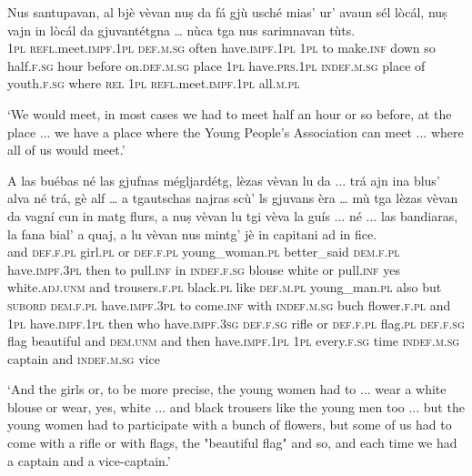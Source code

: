 \begin{linenumbers}
	\gll Nus santupavan, al bjè vèvan nuṣ da fá gjù usché mias’ ur’ avaun sél lòcál, nuṣ vajn in lòcál da gjuvantétgna … nùca tga nus sarimnavan tùts.   \\
	\textsc{1pl} \textsc{refl}.meet.\textsc{impf.1pl} \textsc{def.m.sg} often have.\textsc{impf.1pl} \textsc{1pl} to make.\textsc{inf} down so half.\textsc{f.sg} hour before on.\textsc{def.m.sg} place \textsc{1pl} have.\textsc{prs.1pl} \textsc{indef.m.sg} place of youth.\textsc{f.sg} {} where \textsc{rel} \textsc{1pl} \textsc{refl}.meet.\textsc{impf.1pl} all.\textsc{m.pl} \\
\end{linenumbers}
\medskip
\glt `We would meet, in most cases we had to meet half an hour or so before, at the place ... we have a place where the Young People's Association can meet ... where all of us would meet.'
\medskip

\begin{linenumbers}
	\gll A las buébas né las gjufnas mégljardétg, lèzas vèvan lu da ... trá ajn ina blus’ alva né trá, gè alf … a tgautschas najras scù’ ls gjuvans èra … mù tga lèzas vèvan da vagní cun in matg flurs, a nuṣ vèvan lu tgi vèva la guís ... né ... las bandiaras, la fana bial’ a quaj, a lu vèvan nus mintg’ jè in capitani ad in fice.   \\
and \textsc{def.f.pl} girl.\textsc{pl} or \textsc{def.f.pl} young\_woman.\textsc{pl} better\_said \textsc{dem.f.pl} have.\textsc{impf.3pl} then to {} pull.\textsc{inf} in \textsc{indef.f.sg} blouse white or pull.\textsc{inf} yes white.\textsc{adj.unm} {} and trousers.\textsc{f.pl} black.\textsc{pl} like \textsc{def.m.pl} young\_man.\textsc{pl} also {} but \textsc{subord} \textsc{dem.f.pl} have.\textsc{impf.3pl} to come.\textsc{inf} with \textsc{indef.m.sg} buch flower.\textsc{f.pl} and \textsc{1pl} have.\textsc{impf.1pl} then who have.\textsc{impf.3sg} \textsc{def.f.sg} rifle {} or {} \textsc{def.f.pl} flag.\textsc{pl} \textsc{def.f.sg} flag beautiful and \textsc{dem.unm} and then have.\textsc{impf.1pl} \textsc{1pl} every.\textsc{f.sg} time \textsc{indef.m.sg} captain and \textsc{indef.m.sg} vice 	\\
\end{linenumbers}
\medskip
\glt `And the girls or, to be more precise, the young women had to ... wear a white blouse or wear, yes, white ... and black trousers like the young men too ... but the young women had to participate with a bunch of flowers, but some of us had to come with a rifle or with flags, the "beautiful flag" and so, and each time we had a captain and a vice-captain.'
\medskip

